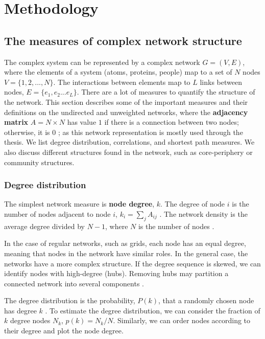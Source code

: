 \chapter{Methodology} %
\label{Ch:Method}

\section{The measures of complex network structure}

The complex system can be represented by a complex network $G=(V, E)$, where the elements of a system (atoms, proteins, people) map to a set of $N$ nodes $V=\{1, 2, ..., N\}$. The interactions between elements map to $L$ links between nodes, $E = \{ e_1, e_2... e_L\}$. There are a lot of measures to quantify the structure of the network. This section describes some of the important measures and their definitions on the undirected and unweighted networks, where the \textbf{adjacency matrix} ${A} = N \times N$ has value $1$ if there is a connection between two nodes; otherwise, it is $0$ \cite{boccaletti2006complex}; as this network representation is mostly used through the thesis. We list degree distribution, correlations, and shortest path measures. We also discuss different structures found in the network, such as core-periphery or community structures.   

\subsection{Degree distribution}

The simplest network measure is \textbf{node degree}, $k$. The degree of node $i$ is the number of nodes adjacent 
to node $i$, $k_i = \sum_j A_{ij}$ \cite{boccaletti2006complex, newman2010}. The network density is the average degree divided by $N-1$, where $N$ is the number of nodes \cite{estrada2015first}. 
 
In the case of regular networks, such as grids, each node has an equal degree, meaning that nodes in the network have similar roles. In the general case, the networks have a more complex structure. If the degree sequence is skewed, we can identify nodes with high-degree (hubs). Removing hubs may partition a connected network into several components \cite{albert2000error}.
 
The degree distribution is the probability, $P(k)$, that a randomly chosen node has degree $k$ \cite{newman2010, estrada2015first}. To estimate the degree distribution, we can consider the fraction of $k$ degree nodes $N_k$, $p(k) = N_k/N$. Similarly, we can order nodes according to their degree and plot the node degree.

